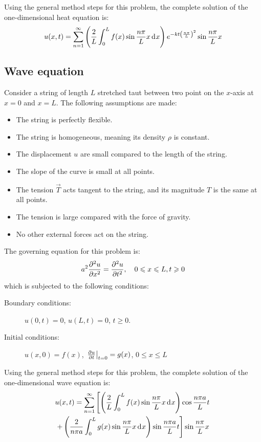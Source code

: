 \documentclass[10pt, twocolumn]{article}
\begin{document}
Using the general method steps for this problem, the complete solution of the one-dimensional heat equation is:
\[
  u(x,t) = \sum_{n = 1}^\infty \left( \frac{2}{L} \int_0^L{f(x) \sin\frac{n \pi}{L} x \,\mathrm{d}^{} x} \right) e^{-k t \left( \frac{n\pi}{L} \right)^2} \sin\frac{n \pi}{L} x \\
\]


\subsection{Wave equation}
Consider a string of length \(L\) stretched taut between two point on the \(x\)-axis at \(x = 0\) and \(x = L\).
The following assumptions are made:
\begin{itemize}
  \item The string is perfectly flexible.
  \item The string is homogeneous, meaning its density \(\rho\) is constant.
  \item The displacement \(u\) are small compared to the length of the string.
  \item The slope of the curve is small at all points.
  \item The tension \(\vec{T}\) acts tangent to the string, and its magnitude \(T\) is the same at all points.
  \item The tension is large compared with the force of gravity.
  \item No other external forces act on the string.
\end{itemize}

The governing equation for this problem is:
\[
  a^2 \frac{\partial^{2} u}{\partial x^{2}} = \frac{\partial^{2} u}{\partial t^{2}}, \quad 0 \leqslant x \leqslant L, t \geqslant 0
\]
which is subjected to the following conditions:
\begin{description}
  \item[Boundary conditions:] \(u(0,t) = 0\), \(u(L,t) = 0\), \(t \geqslant 0\).
  \item[Initial conditions:] \(u(x,0) = f(x)\), \(\left. \frac{\partial u}{\partial t} \right|_{t = 0} = g(x)\), \(0 \leqslant x \leqslant L\)
\end{description}

Using the general method steps for this problem, the complete solution of the one-dimensional wave equation is:
\begin{multline*}
  u(x,t) = \sum_{n = 1}^\infty \left[ \left( \frac{2}{L} \int_0^L{f(x) \sin\frac{n \pi}{L} x \,\mathrm{d}^{} x} \right) \cos\frac{n \pi a}{L}t \right. \\
  \left.+ \left( \frac{2}{n \pi a} \int_0^L{g(x) \sin\frac{n \pi}{L} x \,\mathrm{d}^{} x} \right) \sin\frac{n \pi a}{L}t \right] \sin\frac{n \pi}{L} x
\end{multline*}
\end{document}
